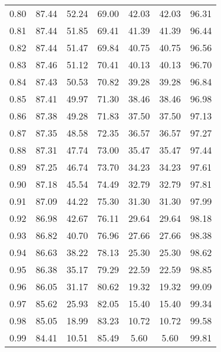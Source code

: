 \begin{tabular}{|c|c|c|c|c|c|c|}
      0.80 &     87.44 &     52.24 &      69.00 &   42.03 &      42.03 &         96.31 \\
      0.81 &     87.44 &     51.85 &      69.41 &   41.39 &      41.39 &         96.44 \\
      0.82 &     87.44 &     51.47 &      69.84 &   40.75 &      40.75 &         96.56 \\
      0.83 &     87.46 &     51.12 &      70.41 &   40.13 &      40.13 &         96.70 \\
      0.84 &     87.43 &     50.53 &      70.82 &   39.28 &      39.28 &         96.84 \\
      0.85 &     87.41 &     49.97 &      71.30 &   38.46 &      38.46 &         96.98 \\
      0.86 &     87.38 &     49.28 &      71.83 &   37.50 &      37.50 &         97.13 \\
      0.87 &     87.35 &     48.58 &      72.35 &   36.57 &      36.57 &         97.27 \\
      0.88 &     87.31 &     47.74 &      73.00 &   35.47 &      35.47 &         97.44 \\
      0.89 &     87.25 &     46.74 &      73.70 &   34.23 &      34.23 &         97.61 \\
      0.90 &     87.18 &     45.54 &      74.49 &   32.79 &      32.79 &         97.81 \\
      0.91 &     87.09 &     44.22 &      75.30 &   31.30 &      31.30 &         97.99 \\
      0.92 &     86.98 &     42.67 &      76.11 &   29.64 &      29.64 &         98.18 \\
      0.93 &     86.82 &     40.70 &      76.96 &   27.66 &      27.66 &         98.38 \\
      0.94 &     86.63 &     38.22 &      78.13 &   25.30 &      25.30 &         98.62 \\
      0.95 &     86.38 &     35.17 &      79.29 &   22.59 &      22.59 &         98.85 \\
      0.96 &     86.05 &     31.17 &      80.62 &   19.32 &      19.32 &         99.09 \\
      0.97 &     85.62 &     25.93 &      82.05 &   15.40 &      15.40 &         99.34 \\
      0.98 &     85.05 &     18.99 &      83.23 &   10.72 &      10.72 &         99.58 \\
      0.99 &     84.41 &     10.51 &      85.49 &    5.60 &       5.60 &         99.81 \\
\bottomrule
\end{tabular}
